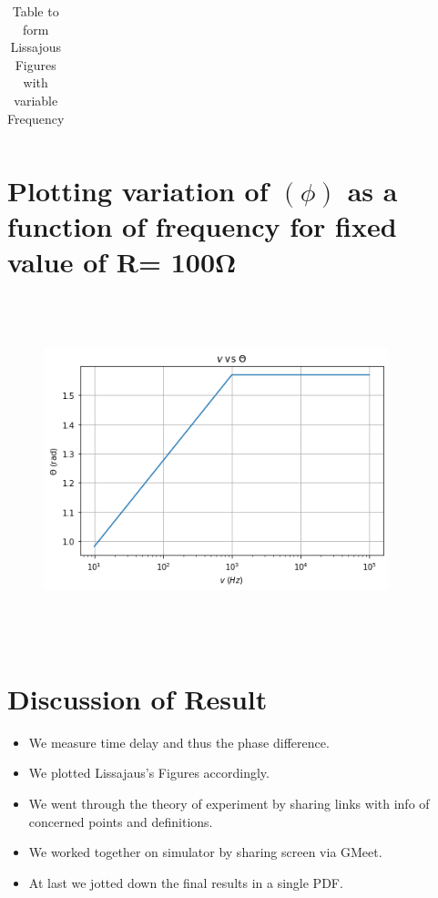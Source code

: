 \documentclass{article}
\begin{document}
\begin{table}[!htp]
\begin{tabular}{  >{\raggedright}m{1cm}  m{1.5cm}  m{1.5cm} m{1.5cm} m{1.5cm} m{1.5cm} m{5cm}  }
\bottomrule
    \end{tabular}

    \caption{Table to form Lissajous Figures with variable Frequency}
    \label{table4.2}
\end{table}
\newpage
\section{Plotting variation  of $(\phi)$ as  a  function  of  frequency  for  fixed  value  of R= 100Ω}
\begin{figure}[h]
    \centering
    \includegraphics[width = 10cm,height = 10cm ]{v_vs_theta.png}
\end{figure}

\section{Discussion of Result}
\begin{itemize}
    \item We measure time delay and thus the phase difference.
    \item We plotted Lissajaus's Figures accordingly.
    \item We went through the theory of experiment by sharing links with info of concerned points and definitions.
    \item We worked together on simulator by sharing screen via GMeet.
    \item At last we jotted down the final results in a single PDF.
\end{itemize}
\end{document}
